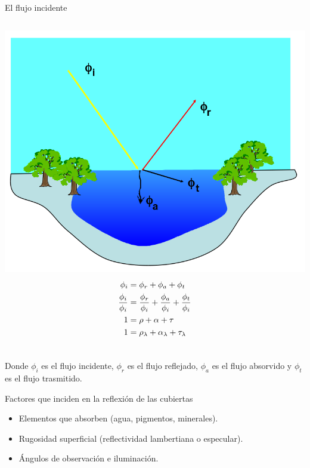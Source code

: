 \documentclass{beamer}
\begin{document}
\begin{frame}{El flujo incidente}
	\begin{columns}
		\includegraphics[width=\textwidth]{IMGs/flujo}
		\begin{align}
		\phi_i & =  \phi_r + \phi_a + \phi_t \notag \\
		\frac{\phi_i}{\phi_i} & =  \frac{\phi_r}{\phi_i} + \frac{\phi_a}{\phi_i} + \frac{\phi_t}{\phi_i} \notag \\
		1 & =  \rho + \alpha + \tau \notag  \\
		1 & =  \rho_\lambda + \alpha_\lambda + \tau_\lambda \notag 
		\end{align}	
	\end{columns}
	\bigskip
	{\footnotesize Donde $\phi_i$ es el flujo incidente, $\phi_r$ es el flujo reflejado, $\phi_a$ es el flujo absorvido y $\phi_t$ es el flujo trasmitido.}
\end{frame}

\begin{frame}{Factores que inciden en la reflexión de las cubiertas}
	\begin{itemize}
		\item Elementos que absorben (agua, pigmentos, minerales).
		\item Rugosidad superficial (reflectividad lambertiana o especular).
		\item Ángulos de observación e iluminación.
	\end{itemize}
\end{frame}
\end{document}
